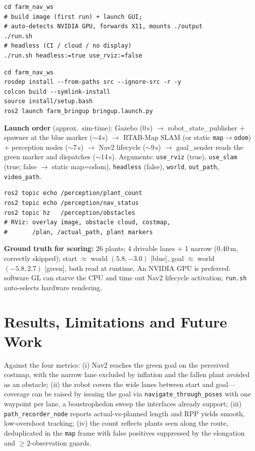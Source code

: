 \documentclass[10pt,journal,twoside]{IEEEtran}
\begin{document}
\begin{lstlisting}[style=bash,caption={Quick start (Docker).},captionpos=b]
cd farm_nav_ws
# build image (first run) + launch GUI;
# auto-detects NVIDIA GPU, forwards X11, mounts ./output
./run.sh
# headless (CI / cloud / no display)
./run.sh headless:=true use_rviz:=false
\end{lstlisting}

\begin{lstlisting}[style=bash,caption={Native build on Ubuntu 22.04.},captionpos=b]
cd farm_nav_ws
rosdep install --from-paths src --ignore-src -r -y
colcon build --symlink-install
source install/setup.bash
ros2 launch farm_bringup bringup.launch.py
\end{lstlisting}

\noindent \textbf{Launch order} (approx.\ sim-time): Gazebo (0\,s) $\rightarrow$ robot\_state\_publisher + spawner at the blue marker ($\sim$4\,s) $\rightarrow$ RTAB-Map SLAM (or static \texttt{map$\rightarrow$odom}) + perception nodes ($\sim$7\,s) $\rightarrow$ Nav2 lifecycle ($\sim$9\,s) $\rightarrow$ goal\_sender reads the green marker and dispatches ($\sim$14\,s). Arguments: \texttt{use\_rviz} (true), \texttt{use\_slam} (true; false $\rightarrow$ static map=odom), \texttt{headless} (false), \texttt{world}, \texttt{out\_path}, \texttt{video\_path}.

\begin{lstlisting}[style=bash,caption={Inspect a live run.},captionpos=b]
ros2 topic echo /perception/plant_count
ros2 topic echo /perception/nav_status
ros2 topic hz   /perception/obstacles
# RViz: overlay image, obstacle cloud, costmap,
#       /plan, /actual_path, plant markers
\end{lstlisting}

\noindent \textbf{Ground truth for scoring:} 26 plants; 4 drivable lanes + 1 narrow (0.40\,m, correctly skipped); start $\approx$ world $(5.8,-3.0)$ [blue], goal $\approx$ world $(-5.8,2.7)$ [green], both read at runtime. An NVIDIA GPU is preferred: software GL can starve the CPU and time out Nav2 lifecycle activation; \texttt{run.sh} auto-selects hardware rendering.

\section{Results, Limitations and Future Work}
Against the four metrics: (i) Nav2 reaches the green goal on the perceived costmap, with the narrow lane excluded by inflation and the fallen plant avoided as an obstacle; (ii) the robot covers the wide lanes between start and goal---coverage can be raised by issuing the goal via \texttt{navigate\_through\_poses} with one waypoint per lane, a boustrophedon sweep the interfaces already support; (iii) \texttt{path\_recorder\_node} reports actual-vs-planned length and RPP yields smooth, low-overshoot tracking; (iv) the count reflects plants seen along the route, deduplicated in the \texttt{map} frame with false positives suppressed by the elongation and $\ge2$-observation guards.
\end{document}
